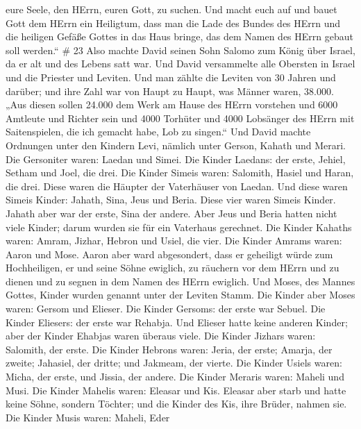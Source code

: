 eure Seele, den HErrn, euren Gott, zu suchen. Und macht euch auf und
bauet Gott dem HErrn ein Heiligtum, dass man die Lade des Bundes des
HErrn und die heiligen Gefäße Gottes in das Haus bringe, das dem Namen
des HErrn gebaut soll werden.`` \# 23  Also machte David
seinen Sohn Salomo zum König über Israel, da er alt und des Lebens satt
war.  Und David versammelte alle Obersten in Israel und die
Priester und Leviten.  Und man zählte die Leviten von 30
Jahren und darüber; und ihre Zahl war von Haupt zu Haupt, was Männer
waren, 38.000.  „Aus diesen sollen 24.000 dem Werk am Hause
des HErrn vorstehen und 6000 Amtleute und Richter sein  und
4000 Torhüter und 4000 Lobsänger des HErrn mit Saitenspielen, die ich
gemacht habe, Lob zu singen.``  Und David machte Ordnungen
unter den Kindern Levi, nämlich unter Gerson, Kahath und Merari.
 Die Gersoniter waren: Laedan und Simei.  Die
Kinder Laedans: der erste, Jehiel, Setham und Joel, die drei.
 Die Kinder Simeis waren: Salomith, Hasiel und Haran, die
drei. Diese waren die Häupter der Vaterhäuser von Laedan. 
Und diese waren Simeis Kinder: Jahath, Sina, Jeus und Beria. Diese vier
waren Simeis Kinder.  Jahath aber war der erste, Sina der
andere. Aber Jeus und Beria hatten nicht viele Kinder; darum wurden sie
für ein Vaterhaus gerechnet.  Die Kinder Kahaths waren:
Amram, Jizhar, Hebron und Usiel, die vier.  Die Kinder
Amrams waren: Aaron und Mose. Aaron aber ward abgesondert, dass er
geheiligt würde zum Hochheiligen, er und seine Söhne ewiglich, zu
räuchern vor dem HErrn und zu dienen und zu segnen in dem Namen des
HErrn ewiglich.  Und Moses, des Mannes Gottes, Kinder
wurden genannt unter der Leviten Stamm.  Die Kinder aber
Moses waren: Gersom und Elieser.  Die Kinder Gersoms: der
erste war Sebuel.  Die Kinder Eliesers: der erste war
Rehabja. Und Elieser hatte keine anderen Kinder; aber der Kinder Ehabjas
waren überaus viele.  Die Kinder Jizhars waren: Salomith,
der erste.  Die Kinder Hebrons waren: Jeria, der erste;
Amarja, der zweite; Jahasiel, der dritte; und Jakmeam, der vierte.
 Die Kinder Usiels waren: Micha, der erste, und Jissia, der
andere.  Die Kinder Meraris waren: Maheli und Musi. Die
Kinder Mahelis waren: Eleasar und Kis.  Eleasar aber starb
und hatte keine Söhne, sondern Töchter; und die Kinder des Kis, ihre
Brüder, nahmen sie.  Die Kinder Musis waren: Maheli, Eder
